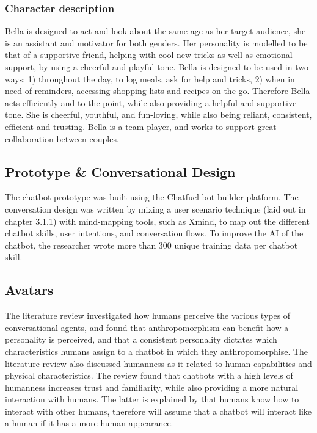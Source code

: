    \subsubsection{Character description}
    Bella is designed to act and look about the same age as her target audience, she is an assistant and motivator for both genders. Her personality is modelled to be that of a supportive friend, helping with cool new tricks as well as emotional support, by using a cheerful and playful tone. Bella is designed to be used in two ways; 1) throughout the day, to log meals, ask for help and tricks, 2) when in need of reminders, accessing shopping lists and recipes on the go. Therefore Bella acts efficiently and to the point, while also providing a helpful and supportive tone. She is cheerful, youthful, and fun-loving, while also being reliant, consistent, efficient and trusting. Bella is a team player, and works to support great collaboration between couples. 

\vspace{5mm}

    \subsection{Prototype \& Conversational Design}
    The chatbot prototype was built using the Chatfuel bot builder platform. The conversation design was written by mixing a user scenario technique (laid out in chapter 3.1.1) with mind-mapping tools, such as Xmind, to map out the different chatbot skills, user intentions, and conversation flows. To improve the AI of the chatbot, the researcher wrote more than 300 unique training data per chatbot skill.
        
\vspace{5mm}

    \subsection{Avatars}
    The literature review investigated how humans perceive the various types of conversational agents, and found that anthropomorphism can benefit how a personality is perceived, and that a consistent personality dictates which characteristics humans assign to a chatbot in which they anthropomorphise. The literature review also discussed humanness as it related to human capabilities and physical characteristics. The review found that chatbots with a high levels of humanness increases trust and familiarity, while also providing a more natural interaction with humans. The latter is explained by that humans know how to interact with other humans, therefore will assume that a chatbot will interact like a human if it has a more human appearance. 
        
